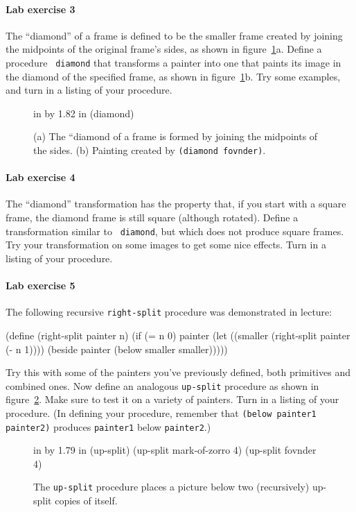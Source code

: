 \paragraph{Lab exercise 3}
The ``diamond'' of a frame is defined to be the smaller frame
created by joining the midpoints of the original frame's sides, as shown in
figure~\ref{diamond}a.  Define a procedure {\tt
diamond} that transforms a painter into one that paints its image in
the diamond of the specified frame, as shown in
figure~\ref{diamond}b.  Try some examples, and turn in a listing of
your procedure.

\begin{figure}
 in by 1.82 in (diamond)
\caption{{\protect\footnotesize
(a) The ``diamond of a frame is formed by joining the midpoints
of the sides.  (b) Painting created by {\tt (diamond fovnder)}.}}
\label{diamond}
\end{figure} 

\paragraph{Lab exercise 4}

The ``diamond'' transformation has the property that, if you start
with a square frame, the diamond frame is still square
(although rotated).  Define a transformation similar to {\tt
diamond}, but which does not produce square frames.  Try your
transformation on some images to get some nice effects.  Turn in a
listing of your procedure.

\paragraph{Lab exercise 5}
The following recursive {\tt right-split} procedure was demonstrated
in lecture:

\beginlisp
(define (right-split painter n)
  (if (= n 0)
      painter
      (let ((smaller (right-split painter (- n 1))))
        (beside painter (below smaller smaller)))))
\endlisp

Try this with some of the painters you've previously defined, both
primitives and combined ones.  Now define an analogous {\tt up-split}
procedure as shown in figure~\ref{up-split}.  Make sure to test it on
a variety of painters.  Turn in a listing of your procedure.  (In
defining your procedure, remember that {\tt (below painter1
painter2)} produces {\tt painter1} below {\tt painter2}.)

\begin{figure}
 in by 1.79 in (up-split)
\beginlisp
                  (up-split mark-of-zorro 4)      (up-split fovnder 4)
\endlisp
\caption{{\protect\footnotesize
The {\tt up-split} procedure places a picture below two (recursively)
up-split copies of itself.}}
\label{up-split}
\end{figure} 


